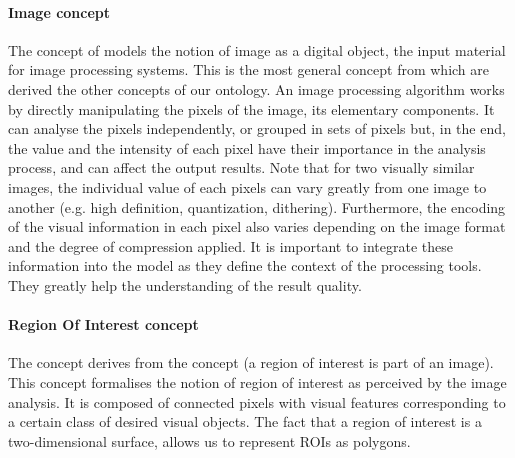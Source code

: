 \paragraph{Image concept} %
\label{par:image_concept}

The concept of  models the notion of image as a digital object, the input material for image processing systems.
This is the most general concept from which are derived the other concepts of our ontology.
An image processing algorithm works by directly manipulating the pixels of the image, its elementary components.
It can analyse the pixels independently, or grouped in sets of pixels but, in the end, the value and the intensity of each pixel have their importance in the analysis process, and can affect the output results.
Note that for two visually similar images, the individual value of each pixels can vary greatly from one image to another (e.g. high definition, quantization, dithering).
Furthermore, the encoding of the visual information in each pixel also varies depending on the image format and the degree of compression applied.
It is important to integrate these information into the model as they define the context of the processing tools.
They greatly help the understanding of the result quality.

\paragraph{Region Of Interest concept} %
\label{par:region_concept}

The concept  derives from the concept  (a region of interest is part of an image).
This concept formalises the notion of region of interest as perceived by the image analysis.
It is composed of connected pixels with visual features corresponding to a certain class of desired visual objects.
The fact that a region of interest is a two-dimensional surface, allows us to represent ROIs as polygons.


